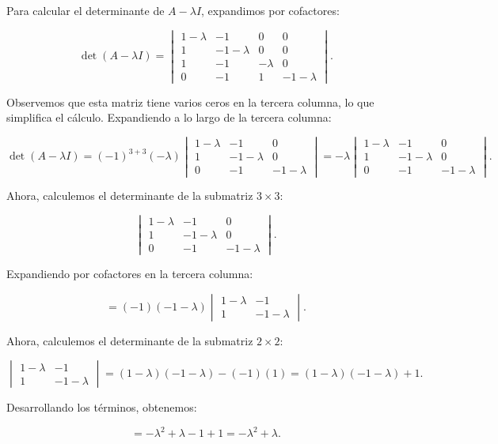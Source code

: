 \documentclass{article}
\begin{document}
Para calcular el determinante de \( A - \lambda I \), expandimos por cofactores:

\[
\det(A - \lambda I) = \begin{vmatrix} 1 - \lambda & -1 & 0 & 0 \\ 1 & -1 - \lambda & 0 & 0 \\ 1 & -1 & -\lambda & 0 \\ 0 & -1 & 1 & -1 - \lambda \end{vmatrix}.
\]

Observemos que esta matriz tiene varios ceros en la tercera columna, lo que simplifica el cálculo. Expandiendo a lo largo de la tercera columna:

\[
\det(A - \lambda I) = (-1)^{3+3}(-\lambda) \begin{vmatrix} 1 - \lambda & -1 & 0 \\ 1 & -1 - \lambda & 0 \\ 0 & -1 & -1 - \lambda \end{vmatrix} = -\lambda \begin{vmatrix} 1 - \lambda & -1 & 0 \\ 1 & -1 - \lambda & 0 \\ 0 & -1 & -1 - \lambda \end{vmatrix}.
\]

Ahora, calculemos el determinante de la submatriz \( 3 \times 3 \):

\[
\begin{vmatrix} 1 - \lambda & -1 & 0 \\ 1 & -1 - \lambda & 0 \\ 0 & -1 & -1 - \lambda \end{vmatrix}.
\]

Expandiendo por cofactores en la tercera columna:

\[
= (-1)(-1 - \lambda) \begin{vmatrix} 1 - \lambda & -1 \\ 1 & -1 - \lambda \end{vmatrix}.
\]

Ahora, calculemos el determinante de la submatriz \( 2 \times 2 \):

\[
\begin{vmatrix} 1 - \lambda & -1 \\ 1 & -1 - \lambda \end{vmatrix} = (1 - \lambda)(-1 - \lambda) - (-1)(1) = (1 - \lambda)(-1 - \lambda) + 1.
\]

Desarrollando los términos, obtenemos:

\[
= -\lambda^2 + \lambda - 1 + 1 = -\lambda^2 + \lambda.
\]
\end{document}
